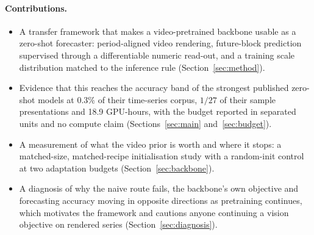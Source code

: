 \paragraph{Contributions.}
\begin{itemize}
\item A transfer framework that makes a video-pretrained backbone usable as a zero-shot forecaster:
      period-aligned video rendering, future-block prediction supervised through a differentiable
      numeric read-out, and a training scale distribution matched to the inference rule
      (Section~\ref{sec:method}).
\item Evidence that this reaches the accuracy band of the strongest published zero-shot models at
      $0.3\%$ of their time-series corpus, $1/27$ of their sample presentations and 18.9 GPU-hours,
      with the budget reported in separated units and no compute claim
      (Sections~\ref{sec:main} and~\ref{sec:budget}).
\item A measurement of what the video prior is worth and where it stops: a matched-size, matched-recipe
      initialisation study with a random-init control at two adaptation budgets
      (Section~\ref{sec:backbone}).
\item A diagnosis of why the naive route fails, the backbone's own objective and forecasting
      accuracy moving in opposite directions as pretraining continues, which motivates the framework
      and cautions anyone continuing a vision objective on rendered series
      (Section~\ref{sec:diagnosis}).
\end{itemize}
